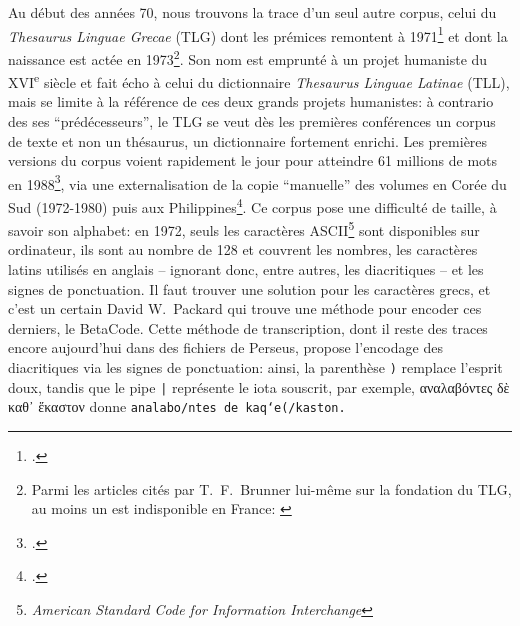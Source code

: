 Au début des années 70, nous trouvons la trace d'un seul autre corpus, celui du \textit{Thesaurus Linguae Grecae} (TLG) dont les prémices remontent à 1971\footcite{brunner_classics_1993} et dont la naissance est actée en 1973\footnote{Parmi les articles cités par T.~F.~Brunner lui-même sur la fondation du TLG, au moins un est indisponible en France: \cite{hugues_homer_1987}}. Son nom est emprunté à un projet humaniste du XVI\textsuperscript{e} siècle et fait écho à celui du dictionnaire \textit{Thesaurus Linguae Latinae} (TLL), mais se limite à la référence de ces deux grands projets humanistes: à contrario des ses \enquote{prédécesseurs}, le TLG se veut dès les premières conférences un corpus de texte et non un thésaurus, un dictionnaire fortement enrichi. Les premières versions du corpus voient rapidement le jour pour atteindre 61 millions de mots en 1988\footcite{brunner_overcoming_1988}, via une externalisation de la copie \enquote{manuelle} des volumes en Corée du Sud (1972-1980) puis aux Philippines\footcite[p. 111]{helgerson_cd-rom_1988}. Ce corpus pose une difficulté de taille, à savoir son alphabet: en 1972, seuls les caractères ASCII\footnote{\textit{American Standard Code for Information Interchange}} sont disponibles sur ordinateur, ils sont au nombre de 128 et couvrent les nombres, les caractères latins utilisés en anglais -- ignorant donc, entre autres, les diacritiques -- et les signes de ponctuation. Il faut trouver une solution pour les caractères grecs, et c'est un certain David W.~Packard qui trouve une méthode pour encoder ces derniers, le BetaCode. Cette méthode de transcription, dont il reste des traces encore aujourd'hui dans des fichiers de Perseus, propose l'encodage des diacritiques via les signes de ponctuation: ainsi, la parenthèse \texttt{)} remplace l'esprit doux, tandis que le pipe \texttt{|} représente le iota souscrit, par exemple, \textgreek{αναλαβόντες δὲ καθ᾽ ἕκαστον} donne \texttt{analabo/ntes de\ kaq`e(/kaston.}



